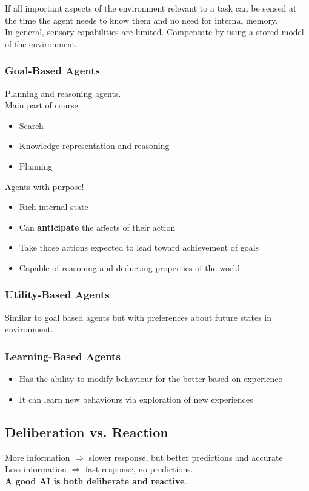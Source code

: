 \documentclass[a4paper]{article}
\begin{document}
If all important aspects of the environment relevant to a task can be sensed at
the time the agent needs to know them and no need for internal memory.\\
In general, sensory capabilities are limited. Compensate by using a stored model
of the environment.

\subsubsection{Goal-Based Agents}
Planning and reasoning agents. \\
Main part of course:
\begin{itemize}
  \item Search
  \item Knowledge representation and reasoning
  \item Planning
\end{itemize}
Agents with purpose!
\begin{itemize}
  \item Rich internal state
  \item Can \textbf{anticipate} the affects of their action
  \item Take those actions expected to lead toward achievement of goals
  \item Capable of reasoning and deducting properties of the world
\end{itemize}

\subsubsection{Utility-Based Agents}
Similar to goal based agents but with preferences about future states in
environment.

\subsubsection{Learning-Based Agents}
\begin{itemize}
  \item Has the ability to modify behaviour for the better based on experience
  \item It can learn new behaviours via exploration of new experiences
\end{itemize}

\subsection{Deliberation vs. Reaction}
More information $\Rightarrow$ slower response, but better predictions and
accurate\\
Less information $\Rightarrow$ fast response, no predictions.\\
\textbf{A good AI is both deliberate and reactive}.
\end{document}
